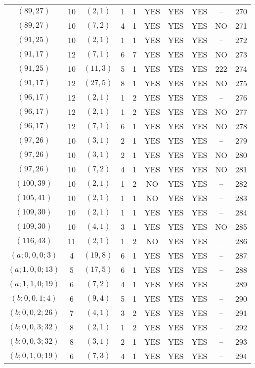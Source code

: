 \begin{longtable}{|c|c|c|c|c|c|c|c|c|c|}
$(89, 27)$ & 10 & $(2, 1)$ & 1 & 1 & YES & YES & YES & -- & 270\\
$(89, 27)$ & 10 & $(7, 2)$ & 4 & 1 & YES & YES & YES & NO & 271\\
$(91, 25)$ & 10 & $(2, 1)$ & 1 & 1 & YES & YES & YES & -- & 272\\
$(91, 17)$ & 12 & $(7, 1)$ & 6 & 7 & YES & YES & YES & NO & 273\\
$(91, 25)$ & 10 & $(11, 3)$ & 5 & 1 & YES & YES & YES & 222 & 274\\
$(91, 17)$ & 12 & $(27, 5)$ & 8 & 1 & YES & YES & YES & NO & 275\\
$(96, 17)$ & 12 & $(2, 1)$ & 1 & 2 & YES & YES & YES & -- & 276\\
$(96, 17)$ & 12 & $(2, 1)$ & 1 & 2 & YES & YES & YES & NO & 277\\
$(96, 17)$ & 12 & $(7, 1)$ & 6 & 1 & YES & YES & YES & NO & 278\\
$(97, 26)$ & 10 & $(3, 1)$ & 2 & 1 & YES & YES & YES & -- & 279\\
$(97, 26)$ & 10 & $(3, 1)$ & 2 & 1 & YES & YES & YES & NO & 280\\
$(97, 26)$ & 10 & $(7, 2)$ & 4 & 1 & YES & YES & YES & NO & 281\\
$(100, 39)$ & 10 & $(2, 1)$ & 1 & 2 & NO & YES & YES & -- & 282\\
$(105, 41)$ & 10 & $(2, 1)$ & 1 & 1 & NO & YES & YES & -- & 283\\
$(109, 30)$ & 10 & $(2, 1)$ & 1 & 1 & YES & YES & YES & -- & 284\\
$(109, 30)$ & 10 & $(4, 1)$ & 3 & 1 & YES & YES & YES & NO & 285\\
$(116, 43)$ & 11 & $(2, 1)$ & 1 & 2 & NO & YES & YES & -- & 286\\
$(a; 0, 0, 0; 3)$ & 4 & $(19, 8)$ & 6 & 1 & YES & YES & YES & -- & 287\\
$(a; 1, 0, 0; 13)$ & 5 & $(17, 5)$ & 6 & 1 & YES & YES & YES & -- & 288\\
$(a; 1, 1, 0; 19)$ & 6 & $(7, 2)$ & 4 & 1 & YES & YES & YES & -- & 289\\
$(b; 0, 0, 1; 4)$ & 6 & $(9, 4)$ & 5 & 1 & YES & YES & YES & -- & 290\\
$(b; 0, 0, 2; 26)$ & 7 & $(4, 1)$ & 3 & 2 & YES & YES & YES & -- & 291\\
$(b; 0, 0, 3; 32)$ & 8 & $(2, 1)$ & 1 & 2 & YES & YES & YES & -- & 292\\
$(b; 0, 0, 3; 32)$ & 8 & $(3, 1)$ & 2 & 1 & YES & YES & YES & -- & 293\\
$(b; 0, 1, 0; 19)$ & 6 & $(7, 3)$ & 4 & 1 & YES & YES & YES & -- & 294\\

\end{longtable}
